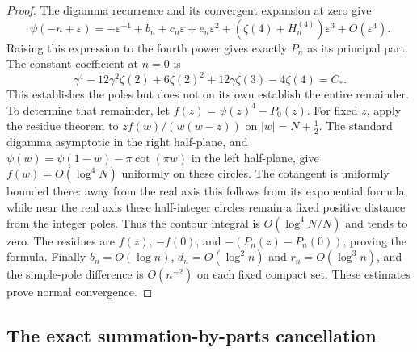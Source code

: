 \begin{proof}
The digamma recurrence and its convergent expansion at zero \cite{bhr:DLMFG} give
\[
 \psi(-n+\varepsilon)
   =-\varepsilon^{-1}+b_n+c_n\varepsilon+e_n\varepsilon^2
       +(\zeta(4)+H_n^{(4)})\varepsilon^3+O(\varepsilon^4).
\]
Raising this expression to the fourth power gives exactly $P_n$ as
its principal part. The constant coefficient at $n=0$ is
\[
 \gamma^4-12\gamma^2\zeta(2)+6\zeta(2)^2
                +12\gamma\zeta(3)-4\zeta(4)=C_*.
\]
This establishes the poles but does not on its own establish the entire
remainder. To determine that remainder, let $f(z)=\psi(z)^4-P_0(z)$.
For fixed $z$, apply the residue theorem to
$z f(w)/(w(w-z))$ on $|w|=N+\tfrac12$.
The standard digamma asymptotic in the right half-plane, and
$\psi(w)=\psi(1-w)-\pi\cot(\pi w)$ in the left half-plane, give
$f(w)=O(\log^4 N)$ uniformly on these circles. The cotangent is
uniformly bounded there: away from the real axis this follows from its
exponential formula, while near the real axis these half-integer circles
remain a fixed positive distance from the integer poles. Thus the
contour integral is $O(\log^4N/N)$ and tends to zero. The residues are
$f(z)$, $-f(0)$, and $-(P_n(z)-P_n(0))$, proving the formula.
Finally $b_n=O(\log n)$, $d_n=O(\log^2n)$ and
$r_n=O(\log^3n)$, and the simple-pole difference is $O(n^{-2})$
on each fixed compact set. These estimates prove normal convergence.
\end{proof}

\subsection{The exact summation-by-parts cancellation}

